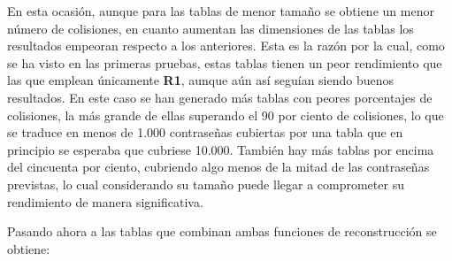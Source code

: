 \documentclass[12pt,spanish,listoffigures,listoftables]{tfgetsinf}
\begin{document}
En esta ocasión, aunque para las tablas de menor tamaño se obtiene un menor número de colisiones, en cuanto aumentan las dimensiones de las tablas los resultados empeoran respecto a los anteriores. Esta es la razón por la cual, como se ha visto en las primeras pruebas, estas tablas tienen un peor rendimiento que las que emplean únicamente \textbf{R1}, aunque aún así seguían siendo buenos resultados. En este caso se han generado más tablas con peores porcentajes de colisiones, la más grande de ellas superando el 90 por ciento de colisiones, lo que se traduce en menos de 1.000 contraseñas cubiertas por una tabla que en principio se esperaba que cubriese 10.000. También hay más tablas por encima del cincuenta por ciento, cubriendo algo menos de la mitad de las contraseñas previstas, lo cual considerando su tamaño puede llegar a comprometer su rendimiento de manera significativa.

Pasando ahora a las tablas que combinan ambas funciones de reconstrucción se obtiene:
\end{document}
